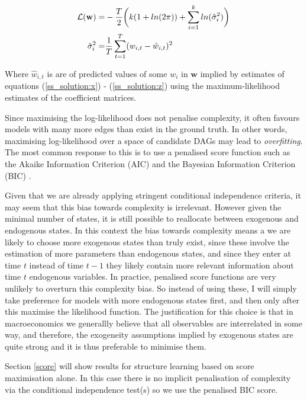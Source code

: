 \documentclass{article}
\begin{document}
\begin{align}
  \mathcal{L(\mathbf{w})} =& -\frac{T}{2} \bigg{(} 
  k (1 + ln(2\pi)) 
  + \sum_{i=1}^{k} ln(\hat{\sigma}_{i}^2)
  \bigg{)} \\
  \hat{\sigma}_{i}^2 =& \frac{1}{T} \sum_{t=1}^{T} (w_{i,t} - \hat{w}_{i,t})^2
\end{align}

Where $\hat{w}_{i,t}$ is are of predicted values of some $w_i$ in $\mathbf{w}$ implied by estimates of equations (\ref{ss_solution:x}) - (\ref{ss_solution:z}) using the maximum-likelihood estimates of the coefficient matrices.

Since maximising the log-likelihood does not penalise complexity, it often favours models with many more edges than exist in the ground truth. In other words, maximising log-likelihood over a space of candidate DAGs may lead to \textit{overfitting}. The most common response to this is to use a penalised score function such as the Akaike Information Criterion (AIC) \parencite{akaike1974new} and the Bayesian Information Criterion (BIC) \parencite{schwarz1978estimating}. 

Given that we are already applying stringent conditional independence criteria, it may seem that this bias towards complexity is irrelevant. However given the minimal number of states, it is still possible to reallocate between exogenous and endogenous states. In this context the bias towards complexity means a we are likely to choose more exogenous states than truly exist, since these involve the estimation of more parameters than endogenous states, and since they enter at time $t$ instead of time $t-1$ they likely contain more relevant information about time $t$ endogenous variables. In practice, penalised score functions are very unlikely to overturn this complexity bias. So instead of using these, I will simply take preference for models with more endogenous states first, and then only after this maximise the likelihood function. The justification for this choice is that in macroeconomics we generallly believe that all observables are interrelated in some way, and therefore, the exogeneity assumptions implied by exogenous states are quite strong and it is thus preferable to minimise them. 

Section \ref{score} will show results for structure learning based on score maximisation alone. In this case there is no implicit penalisation of complexity via the conditional independence test(s) so we use the penalised BIC score. 
\end{document}
